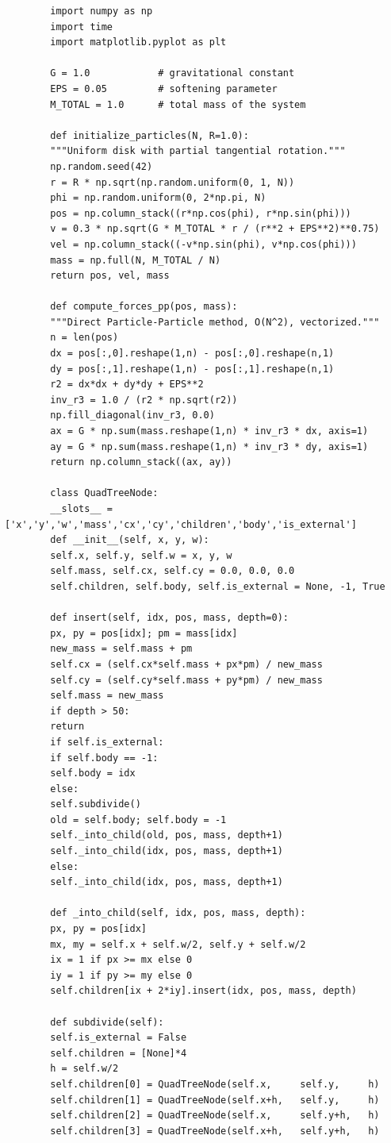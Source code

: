 \documentclass[12pt,a4paper]{article}
\begin{document}
	\begin{lstlisting}
		import numpy as np
		import time
		import matplotlib.pyplot as plt
		
		G = 1.0            # gravitational constant
		EPS = 0.05         # softening parameter
		M_TOTAL = 1.0      # total mass of the system
		
		def initialize_particles(N, R=1.0):
		"""Uniform disk with partial tangential rotation."""
		np.random.seed(42)
		r = R * np.sqrt(np.random.uniform(0, 1, N))
		phi = np.random.uniform(0, 2*np.pi, N)
		pos = np.column_stack((r*np.cos(phi), r*np.sin(phi)))
		v = 0.3 * np.sqrt(G * M_TOTAL * r / (r**2 + EPS**2)**0.75)
		vel = np.column_stack((-v*np.sin(phi), v*np.cos(phi)))
		mass = np.full(N, M_TOTAL / N)
		return pos, vel, mass
		
		def compute_forces_pp(pos, mass):
		"""Direct Particle-Particle method, O(N^2), vectorized."""
		n = len(pos)
		dx = pos[:,0].reshape(1,n) - pos[:,0].reshape(n,1)
		dy = pos[:,1].reshape(1,n) - pos[:,1].reshape(n,1)
		r2 = dx*dx + dy*dy + EPS**2
		inv_r3 = 1.0 / (r2 * np.sqrt(r2))
		np.fill_diagonal(inv_r3, 0.0)
		ax = G * np.sum(mass.reshape(1,n) * inv_r3 * dx, axis=1)
		ay = G * np.sum(mass.reshape(1,n) * inv_r3 * dy, axis=1)
		return np.column_stack((ax, ay))
		
		class QuadTreeNode:
		__slots__ = ['x','y','w','mass','cx','cy','children','body','is_external']
		def __init__(self, x, y, w):
		self.x, self.y, self.w = x, y, w
		self.mass, self.cx, self.cy = 0.0, 0.0, 0.0
		self.children, self.body, self.is_external = None, -1, True
		
		def insert(self, idx, pos, mass, depth=0):
		px, py = pos[idx]; pm = mass[idx]
		new_mass = self.mass + pm
		self.cx = (self.cx*self.mass + px*pm) / new_mass
		self.cy = (self.cy*self.mass + py*pm) / new_mass
		self.mass = new_mass
		if depth > 50:
		return
		if self.is_external:
		if self.body == -1:
		self.body = idx
		else:
		self.subdivide()
		old = self.body; self.body = -1
		self._into_child(old, pos, mass, depth+1)
		self._into_child(idx, pos, mass, depth+1)
		else:
		self._into_child(idx, pos, mass, depth+1)
		
		def _into_child(self, idx, pos, mass, depth):
		px, py = pos[idx]
		mx, my = self.x + self.w/2, self.y + self.w/2
		ix = 1 if px >= mx else 0
		iy = 1 if py >= my else 0
		self.children[ix + 2*iy].insert(idx, pos, mass, depth)
		
		def subdivide(self):
		self.is_external = False
		self.children = [None]*4
		h = self.w/2
		self.children[0] = QuadTreeNode(self.x,     self.y,     h)
		self.children[1] = QuadTreeNode(self.x+h,   self.y,     h)
		self.children[2] = QuadTreeNode(self.x,     self.y+h,   h)
		self.children[3] = QuadTreeNode(self.x+h,   self.y+h,   h)
		

\end{lstlisting}
\end{document}
